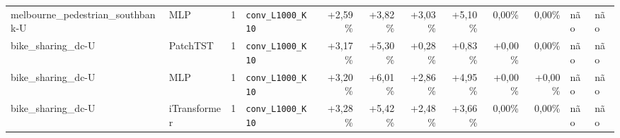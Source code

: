 \begin{longtable}{llrlrrrrrrll}
melbourne\_pedestrian\_southbank-U & MLP & 1 & \texttt{conv\_\allowbreak{}L1000\_\allowbreak{}K10} & +2,59\% & +3,82\% & +3,03\% & +5,10\% & \textminus{}0,00\% & \textminus{}0,00\% & n\~ao & n\~ao \\
bike\_sharing\_dc-U & PatchTST & 1 & \texttt{conv\_\allowbreak{}L1000\_\allowbreak{}K10} & +3,17\% & +5,30\% & +0,28\% & +0,83\% & +0,00\% & \textminus{}0,00\% & n\~ao & n\~ao \\
bike\_sharing\_dc-U & MLP & 1 & \texttt{conv\_\allowbreak{}L1000\_\allowbreak{}K10} & +3,20\% & +6,01\% & +2,86\% & +4,95\% & +0,00\% & +0,00\% & n\~ao & n\~ao \\
bike\_sharing\_dc-U & iTransformer & 1 & \texttt{conv\_\allowbreak{}L1000\_\allowbreak{}K10} & +3,28\% & +5,42\% & +2,48\% & +3,66\% & \textminus{}0,00\% & \textminus{}0,00\% & n\~ao & n\~ao \\
\end{longtable}
\normalsize
